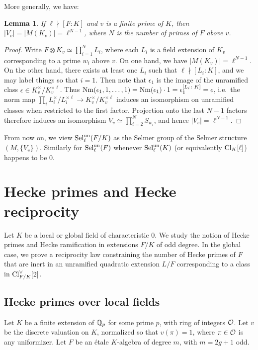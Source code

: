 \documentclass[11pt,a4paper]{amsart}
\def\Q{{\rm \mathbb{Q}}}
\def\O{{\rm \mathcal{O}}}
\def\Nm{{\rm Nm}}
\def\un{{\rm un}}
\def\Cl{{\rm Cl}}
\def\Sel{{\rm Sel}}
\numberwithin{equation}{section}
\newtheorem{lemma}[theorem]{Lemma}
\begin{document}
More generally, we have:
\begin{lemma}\label{lem: local selmer ratio}
    If $\ell \nmid [F: K]$ and $v$ is a finite prime of $K$, then  $|V_v| = |M(K_v)| = \ell^{N-1}$, where $N$ is the number of primes of $F$ above $v$. 
\end{lemma}
\begin{proof}
    Write $F \otimes K_v \simeq \prod_{i = 1}^N L_i$, where each $L_i$ is a field extension of $K_v$ corresponding to a prime $w_i$ above $v$. On one hand, we have $|M(K_v)| = \ell^{N-1}$. On the other hand, there exists at least one $L_i$ such that $\ell \nmid [L_i \colon K]$, and we may label things so that $i = 1$. Then note that $\epsilon_1$ is the image of the unramified class $\epsilon \in K_v^\times/K^{\times \ell}_v$. Thus $\Nm(\epsilon_1, 1, \ldots, 1) = \Nm(\epsilon_1) \cdot 1 = \epsilon_1^{[L_i \colon K]}  = \epsilon$, i.e.\ the norm map $\prod_i L_i^\times/L_i^{\times \ell} \to K_v^\times/K_v^{\times \ell}$ induces an isomorphism on unramified classes when restricted to the first factor. Projection onto the last $N-1$ factors therefore induces an isomorphism $V_v \simeq \prod_{i = 2}^N S_{w_i}$, and hence $|V_v| = \ell^{N-1}$.  
\end{proof}

From now on, we view $\Sel_\ell^\un(F/K)$ as the Selmer group of the Selmer structure $(M, \{V_v\})$. Similarly for $\Sel_\ell^\un(F)$ whenever $\Sel_\ell^\un(K)$ (or equivalently $\Cl_K[\ell]$) happens to be $0$.  

\section{Hecke primes and Hecke reciprocity}\label{sec: reciprocity laws}

Let $K$ be a local or global field of characteristic $0$. We study the notion of Hecke primes and Hecke ramification in extensions $F/K$ of odd degree.  In the global case, we prove a reciprocity law constraining the number of Hecke primes of $F$ that are inert in an unramified quadratic extension $L/F$ corresponding to a class in $\Cl_{F/K}^\vee[2]$. 


\subsection{Hecke primes over local fields}\label{subsec: Hecke primes local fields}
Let $K$ be a finite extension of $\Q_p$ for some prime $p$, with ring of integers $\O$. Let $v$ be the discrete valuation on $K$, normalized so that $v(\pi) = 1$, where $\pi\in \O$ is any uniformizer.  Let $F$ be an \'etale $K$-algebra of degree $m$, with $m = 2g + 1$ odd.  
\end{document}
